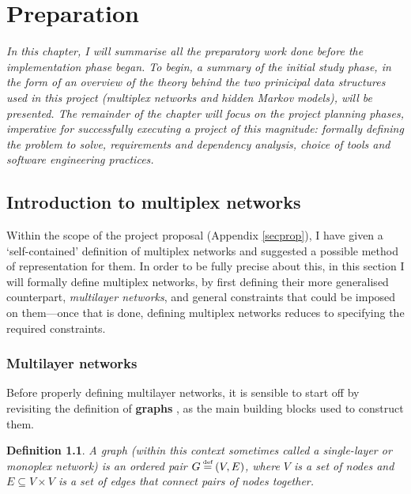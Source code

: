 \documentclass[12pt,a4paper,twoside,openright]{report}
\newtheorem{mydef}{Definition}
\newcommand\myeq{\stackrel{\mathclap{\tiny\mbox{def}}}{=}}
\begin{document}
\chapter{Preparation}

\emph{In this chapter, I will summarise all the preparatory work done before the implementation phase began. To begin, a summary of the initial study phase, in the form of an overview of the theory behind the two prinicipal data structures used in this project (multiplex networks and hidden Markov models), will be presented. The remainder of the chapter will focus on the project planning phases, imperative for successfully executing a project of this magnitude: formally defining the problem to solve, requirements and dependency analysis, choice of tools and software engineering practices.}

\section{Introduction to multiplex networks}\label{secmux}

Within the scope of the project proposal (Appendix \ref{secprop}), I have given a `self-contained' definition of multiplex networks and suggested a possible method of representation for them. In order to be fully precise about this, in this section I will formally define multiplex networks, by first defining their more generalised counterpart, \emph{multilayer networks}, and general constraints that could be imposed on them---once that is done, defining multiplex networks reduces to specifying the required constraints.

\subsection{Multilayer networks}

Before properly defining multilayer networks, it is sensible to start off by revisiting the definition of \textbf{graphs} \cite{bollobas1998modern}, as the main building blocks used to construct them.

\begin{mydef}\label{def:1}
\rm A \emph{graph} (within this context sometimes called a \emph{single-layer} or \emph{monoplex} network) is an ordered pair $G \myeq (V, E)$, where $V$ is a set of \emph{nodes} and $E \subseteq V \times V$ is a set of \emph{edges} that connect pairs of nodes together. 
\end{mydef}
\end{document}
